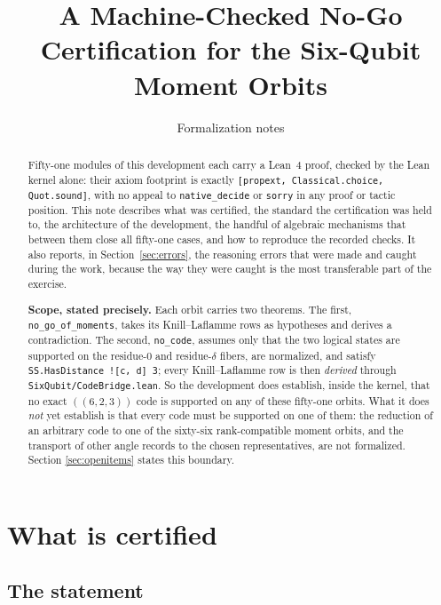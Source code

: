 \documentclass[11pt,a4paper]{article}
\title{A Machine-Checked No-Go Certification for the Six-Qubit Moment Orbits}
\author{Formalization notes}
\date{}
\newcommand{\lean}[1]{\texttt{#1}}
\theoremstyle{definition}
\begin{document}
\maketitle

\begin{abstract}
Fifty-one modules of this development each carry a Lean~4 proof, checked by
the Lean kernel alone: their axiom footprint is exactly
\lean{[propext, Classical.choice, Quot.sound]}, with no appeal to
\lean{native\_decide} or \lean{sorry} in any proof or tactic position. This note
describes what was certified, the standard the certification was held to, the
architecture of the development, the handful of algebraic mechanisms that
between them close all fifty-one cases, and how to reproduce the recorded checks.
It
also reports, in Section~\ref{sec:errors}, the reasoning errors that were made
and caught during the work, because the way they were caught is the most
transferable part of the exercise.

\medskip
\noindent\textbf{Scope, stated precisely.} Each orbit carries two theorems. The
first, \lean{no\_go\_of\_moments}, takes its Knill--Laflamme rows as hypotheses
and derives a contradiction. The second, \lean{no\_code}, assumes only that the
two logical states are supported on the residue-$0$ and residue-$\delta$ fibers,
are normalized, and satisfy \lean{SS.HasDistance ![c, d] 3}; every
Knill--Laflamme row is then \emph{derived} through
\lean{SixQubit/CodeBridge.lean}. So the development does establish, inside the
kernel, that no exact $((6,2,3))$ code is supported on any of these fifty-one
orbits. What it does \emph{not} yet establish is that every code must be
supported on one of them: the reduction of an arbitrary code to one of the
sixty-six rank-compatible moment orbits, and the transport of other angle
records to the chosen representatives, are not formalized. Section
\ref{sec:openitems} states this boundary.
\end{abstract}

\tableofcontents

\section{What is certified}

\subsection{The statement}
\end{document}
